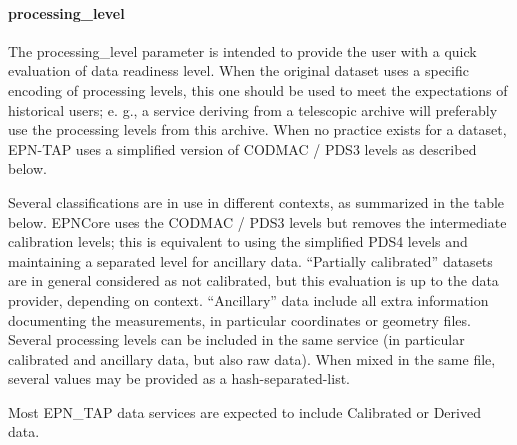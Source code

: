 \documentclass[11pt,a4paper]{ivoa}
\begin{document}
\paragraph{processing\_level}

The processing\_level parameter is intended to provide the user with a quick evaluation of data readiness level. When the original dataset uses a specific encoding of processing levels, this one should be used to meet the expectations of historical users; e. g., a service deriving from a telescopic archive will preferably use the processing levels from this archive. When no practice exists for a dataset, EPN-TAP uses a simplified version of CODMAC / PDS3 levels as described below.

Several classifications are in use in different contexts, as summarized in the table below.  EPNCore uses the CODMAC / PDS3 levels but removes the intermediate calibration levels; this is equivalent to using the simplified PDS4 levels and maintaining a separated level for ancillary data. ``Partially calibrated'' datasets are in general considered as not calibrated, but this evaluation is up to the data provider, depending on context. ``Ancillary'' data include all extra information documenting the measurements, in particular coordinates or geometry files. Several processing levels can be included in the same service (in particular calibrated and ancillary data, but also raw data). When mixed in the same file, several values may be provided as a hash-separated-list.

Most EPN\_TAP data services are expected to include Calibrated or Derived data. 
\end{document}
